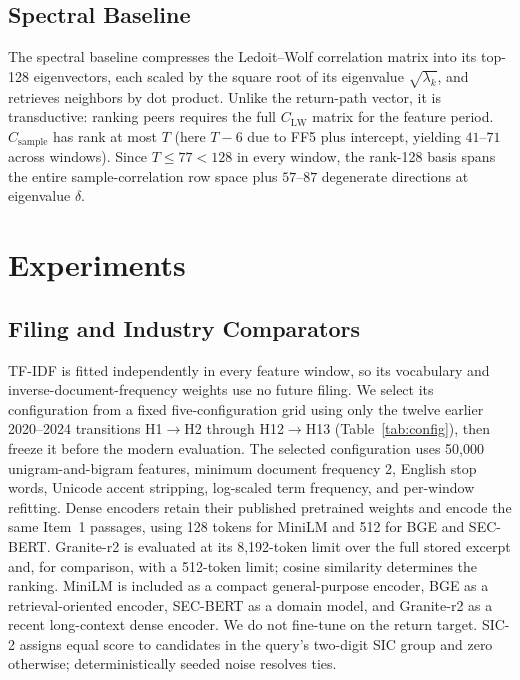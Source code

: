 \documentclass[sigconf,anonymous]{acmart}
\begin{document}
\subsection{Spectral Baseline}
\label{sec:spectral}

The spectral baseline compresses the Ledoit--Wolf correlation matrix into its
top-128 eigenvectors, each scaled by the square root of its eigenvalue
$\sqrt{\lambda_k}$, and retrieves neighbors by dot product.
Unlike the return-path vector, it is transductive: ranking peers requires the
full $C_{\mathrm{LW}}$ matrix for the feature period.
$C_{\mathrm{sample}}$ has rank at most $T$ (here $T-6$ due to FF5 plus intercept,
yielding $41$--$71$ across windows).
Since $T \leq 77 < 128$ in every window, the rank-128 basis spans the entire
sample-correlation row space plus $57$--$87$ degenerate directions at eigenvalue
$\delta$.

\section{Experiments}
\label{sec:experiments}

\subsection{Filing and Industry Comparators}

TF-IDF is fitted independently in every feature window, so its vocabulary and
inverse-document-frequency weights use no future filing.
We select its configuration from a fixed five-configuration grid using only the
twelve earlier 2020--2024 transitions H1$\to$H2 through H12$\to$H13
(Table~\ref{tab:config}), then freeze it
before the modern evaluation.  The selected configuration uses 50{,}000
unigram-and-bigram features, minimum document frequency 2, English stop words,
Unicode accent stripping, log-scaled term frequency, and per-window refitting.
Dense encoders retain their published pretrained weights and encode the same Item~1 passages,
using 128 tokens for MiniLM and 512 for BGE and SEC-BERT.  Granite-r2 is
evaluated at its 8,192-token limit over the full stored excerpt and, for
comparison, with a 512-token limit; cosine similarity determines the ranking.  MiniLM is
included as a compact general-purpose encoder, BGE as a retrieval-oriented
encoder, SEC-BERT as a domain model, and Granite-r2 as a recent long-context
dense encoder.  We do not fine-tune on the return target.  SIC-2 assigns equal
score to candidates in the query's two-digit SIC group and zero otherwise;
deterministically seeded noise resolves ties.
\end{document}
